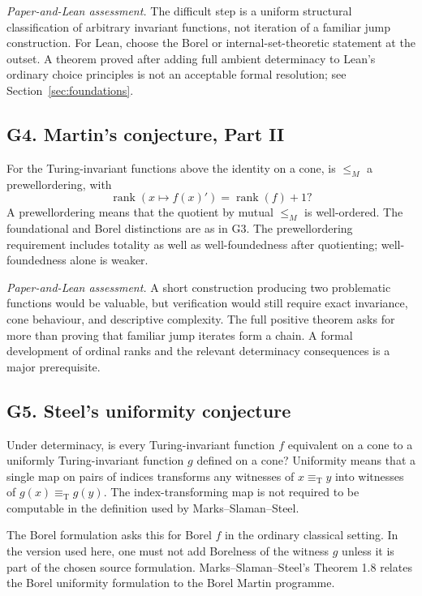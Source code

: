 \documentclass[11pt,a4paper]{article}
\newcommand{\eqT}{\equiv_{\mathrm T}}
\newcommand{\assessment}[1]{\par\noindent\textit{Paper-and-Lean assessment.} #1\par}
\theoremstyle{definition}\newtheorem{definition}[theorem]{Definition}
\theoremstyle{remark}\newtheorem{remark}[theorem]{Remark}
\begin{document}
\assessment{The difficult step is a uniform structural classification of arbitrary invariant functions, not iteration of a familiar jump construction. For Lean, choose the Borel or internal-set-theoretic statement at the outset. A theorem proved after adding full ambient determinacy to Lean's ordinary choice principles is not an acceptable formal resolution; see Section~\ref{sec:foundations}.}

\subsection{G4. Martin's conjecture, Part II \Lmark}
\label{entry:G4}

For the Turing-invariant functions above the identity on a cone, is $\leq_M$ a prewellordering, with
\[
 \operatorname{rank}(x\mapsto f(x)')
   =\operatorname{rank}(f)+1?
\]
A prewellordering means that the quotient by mutual $\leq_M$ is well-ordered. The foundational and Borel distinctions are as in G3. The prewellordering requirement includes totality as well as well-foundedness after quotienting; well-foundedness alone is weaker.\cite{MSS}

\assessment{A short construction producing two problematic functions would be valuable, but verification would still require exact invariance, cone behaviour, and descriptive complexity. The full positive theorem asks for more than proving that familiar jump iterates form a chain. A formal development of ordinal ranks and the relevant determinacy consequences is a major prerequisite.}

\subsection{G5. Steel's uniformity conjecture \Lmark}
\label{entry:G5}

Under determinacy, is every Turing-invariant function $f$ equivalent on a cone to a uniformly Turing-invariant function $g$ defined on a cone? Uniformity means that a single map on pairs of indices transforms any witnesses of $x\eqT y$ into witnesses of $g(x)\eqT g(y)$. The index-transforming map is not required to be computable in the definition used by Marks--Slaman--Steel.\cite[Conjecture 1.4]{MSS}

The Borel formulation asks this for Borel $f$ in the ordinary classical setting. In the version used here, one must not add Borelness of the witness $g$ unless it is part of the chosen source formulation. Marks--Slaman--Steel's Theorem 1.8 relates the Borel uniformity formulation to the Borel Martin programme.\cite{MSS}
\end{document}
